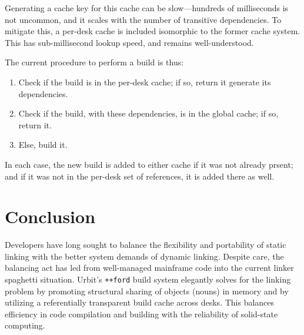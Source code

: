 \documentclass[twoside]{article}
\begin{document}
Generating a cache key for this cache can be slow—hundreds of milliseconds is not uncommon, and it scales with the number of transitive dependencies.  To mitigate this, a per-desk cache is included isomorphic to the former cache system.  This has sub-millisecond lookup speed, and remains well-understood.

The current procedure to perform a build is thus:

\begin{enumerate}
  \item  Check if the build is in the per-desk cache; if so, return it
generate its dependencies.
  \item  Check if the build, with these dependencies, is in the global cache; if so, return it.
  \item  Else, build it.
\end{enumerate}
\noindent
In each case, the new build is added to either cache if it was not already prsent; and if it was not in the per-desk set of references, it is added there as well.

\section{Conclusion}

Developers have long sought to balance the flexibility and portability of static linking with the better system demands of dynamic linking.  Despite care, the balancing act has led from well-managed mainframe code into the current linker spaghetti situation.  Urbit's \texttt{++ford} build system elegantly solves for the linking problem by promoting structural sharing of objects (nouns) in memory and by utilizing a referentially transparent build cache across desks.  This balances efficiency in code compilation and building with the reliability of solid-state computing.



\end{document}
